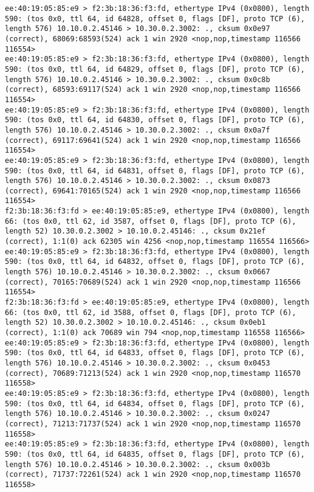 \documentclass[a4paper,12pt]{article}
\begin{document}
\begin{Verbatim}
ee:40:19:05:85:e9 > f2:3b:18:36:f3:fd, ethertype IPv4 (0x0800), length 590: (tos 0x0, ttl 64, id 64828, offset 0, flags [DF], proto TCP (6), length 576) 10.10.0.2.45146 > 10.30.0.2.3002: ., cksum 0x0e97 (correct), 68069:68593(524) ack 1 win 2920 <nop,nop,timestamp 116566 116554>
ee:40:19:05:85:e9 > f2:3b:18:36:f3:fd, ethertype IPv4 (0x0800), length 590: (tos 0x0, ttl 64, id 64829, offset 0, flags [DF], proto TCP (6), length 576) 10.10.0.2.45146 > 10.30.0.2.3002: ., cksum 0x0c8b (correct), 68593:69117(524) ack 1 win 2920 <nop,nop,timestamp 116566 116554>
ee:40:19:05:85:e9 > f2:3b:18:36:f3:fd, ethertype IPv4 (0x0800), length 590: (tos 0x0, ttl 64, id 64830, offset 0, flags [DF], proto TCP (6), length 576) 10.10.0.2.45146 > 10.30.0.2.3002: ., cksum 0x0a7f (correct), 69117:69641(524) ack 1 win 2920 <nop,nop,timestamp 116566 116554>
ee:40:19:05:85:e9 > f2:3b:18:36:f3:fd, ethertype IPv4 (0x0800), length 590: (tos 0x0, ttl 64, id 64831, offset 0, flags [DF], proto TCP (6), length 576) 10.10.0.2.45146 > 10.30.0.2.3002: ., cksum 0x0873 (correct), 69641:70165(524) ack 1 win 2920 <nop,nop,timestamp 116566 116554>
f2:3b:18:36:f3:fd > ee:40:19:05:85:e9, ethertype IPv4 (0x0800), length 66: (tos 0x0, ttl 62, id 3587, offset 0, flags [DF], proto TCP (6), length 52) 10.30.0.2.3002 > 10.10.0.2.45146: ., cksum 0x21ef (correct), 1:1(0) ack 62305 win 4256 <nop,nop,timestamp 116554 116566>
ee:40:19:05:85:e9 > f2:3b:18:36:f3:fd, ethertype IPv4 (0x0800), length 590: (tos 0x0, ttl 64, id 64832, offset 0, flags [DF], proto TCP (6), length 576) 10.10.0.2.45146 > 10.30.0.2.3002: ., cksum 0x0667 (correct), 70165:70689(524) ack 1 win 2920 <nop,nop,timestamp 116566 116554>
f2:3b:18:36:f3:fd > ee:40:19:05:85:e9, ethertype IPv4 (0x0800), length 66: (tos 0x0, ttl 62, id 3588, offset 0, flags [DF], proto TCP (6), length 52) 10.30.0.2.3002 > 10.10.0.2.45146: ., cksum 0x0eb1 (correct), 1:1(0) ack 70689 win 794 <nop,nop,timestamp 116558 116566>
ee:40:19:05:85:e9 > f2:3b:18:36:f3:fd, ethertype IPv4 (0x0800), length 590: (tos 0x0, ttl 64, id 64833, offset 0, flags [DF], proto TCP (6), length 576) 10.10.0.2.45146 > 10.30.0.2.3002: ., cksum 0x0453 (correct), 70689:71213(524) ack 1 win 2920 <nop,nop,timestamp 116570 116558>
ee:40:19:05:85:e9 > f2:3b:18:36:f3:fd, ethertype IPv4 (0x0800), length 590: (tos 0x0, ttl 64, id 64834, offset 0, flags [DF], proto TCP (6), length 576) 10.10.0.2.45146 > 10.30.0.2.3002: ., cksum 0x0247 (correct), 71213:71737(524) ack 1 win 2920 <nop,nop,timestamp 116570 116558>
ee:40:19:05:85:e9 > f2:3b:18:36:f3:fd, ethertype IPv4 (0x0800), length 590: (tos 0x0, ttl 64, id 64835, offset 0, flags [DF], proto TCP (6), length 576) 10.10.0.2.45146 > 10.30.0.2.3002: ., cksum 0x003b (correct), 71737:72261(524) ack 1 win 2920 <nop,nop,timestamp 116570 116558>

\end{Verbatim}
\end{document}
